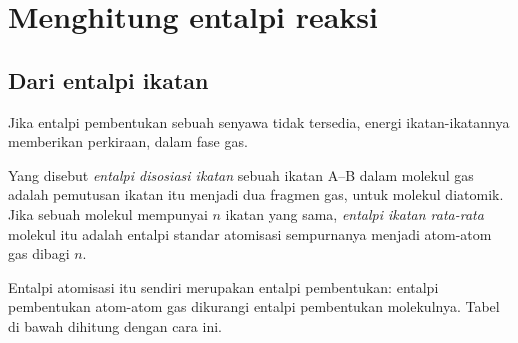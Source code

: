 \section{Menghitung entalpi reaksi}

\subsection*{Dari entalpi ikatan}

Jika entalpi pembentukan sebuah senyawa tidak tersedia, energi
ikatan-ikatannya memberikan perkiraan, dalam fase gas.

\begin{definition}\label{def:b2:reaction-enthalpy:bond-enthalpy}
Yang disebut \emph{entalpi disosiasi ikatan}
sebuah ikatan A--B dalam molekul gas adalah 
pemutusan ikatan itu menjadi dua fragmen gas, 
untuk molekul diatomik. Jika sebuah molekul mempunyai $n$ ikatan yang
sama, \emph{entalpi ikatan rata-rata}
molekul itu adalah entalpi standar atomisasi sempurnanya menjadi atom-atom
gas dibagi $n$.
\end{definition}

Entalpi atomisasi itu sendiri merupakan entalpi pembentukan: entalpi
pembentukan atom-atom gas dikurangi entalpi pembentukan molekulnya. Tabel
di bawah dihitung dengan cara ini.

